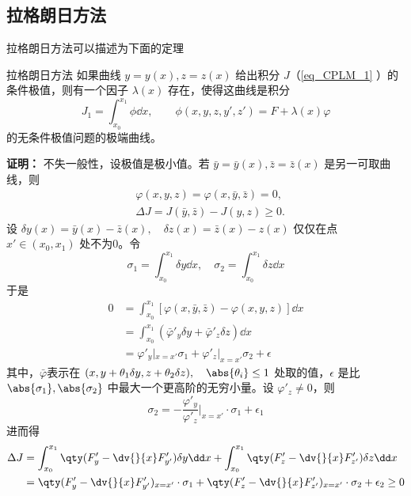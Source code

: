 \subsection{拉格朗日方法}
拉格朗日方法可以描述为下面的定理
\begin{theorem}{拉格朗日方法}
如果曲线 $y=y(x),z=z(x)$ 给出积分 $J$（\autoref{eq_CPLM_1} ）的条件极值，则有一个因子 $\lambda(x)$ 存在，使得这曲线是积分
\begin{equation}
J_1=\int_{x_0}^{x_1}\phi \dd x,\qquad \phi(x,y,z,y',z')=F+\lambda(x)\varphi
\end{equation}
的无条件极值问题的极端曲线。
\end{theorem}
\textbf{证明：}
不失一般性，设极值是极小值。若 $\bar y=\bar y(x),\bar z=\bar z(x)$ 是另一可取曲线，则
\begin{equation}
\begin{aligned}
&\varphi(x,y,z)=\varphi(x,\bar y,\bar z)=0,\\
&\Delta J=J(\bar y,\bar z)-J(y,z)\geq0.
\end{aligned}
\end{equation}
设 $\delta y(x)=\bar y(x)-\bar z(x),\quad\delta z(x)=\bar z(x)-z(x)$ 仅仅在点 $x'\in (x_0,x_1)$ 处不为0。令
\begin{equation}
\sigma_1=\int_{x_0}^{x_1}\delta y\dd x,\quad \sigma_2=\int_{x_0}^{x_1}\delta z\dd x
\end{equation}
于是
\begin{equation}
\begin{aligned}
0&=\int_{x_0}^{x_1}[\varphi(x,\bar y,\bar z)-\varphi(x,y,z)]\dd x\\
&=\int_{x_0}^{x_1}(\bar\varphi'_y\delta y+\bar\varphi'_z\delta z)\dd x\\
&=\varphi'_y|_{x=x'}\sigma_1+\varphi'_z|_{x=x'}\sigma_2+\epsilon
\end{aligned}
\end{equation}
其中，$\bar\varphi$表示在 $(x,y+\theta_1\delta y,z+\theta_2\delta z),\quad \abs{\theta_i}\leq 1$ 处取的值，$\epsilon$ 是比 $\abs{\sigma_1},\abs{\sigma_2}$ 中最大一个更高阶的无穷小量。设 $\varphi'_z\neq0$，则
\begin{equation}\label{eq_CPLM_2}
\sigma_2=-\frac{\varphi'_y}{\varphi'_z}\Big|_{x=x'}\cdot\sigma_1+\epsilon_1
\end{equation}
进而得
\begin{equation}\label{eq_CPLM_3}
\begin{aligned}
\Delta J&=\int_{x_0}^{x_1}\qty(F'_y-\dv{}{x}F'_{y'})\delta y\dd x+\int_{x_0}^{x_1}\qty(F'_z-\dv{}{x}F'_{z'})\delta z\dd x\\
&=\qty(F'_y-\dv{}{x}F'_{y'})_{x=x'}\cdot\sigma_1+\qty(F'_z-\dv{}{x}F'_{z'})_{x=x'}\cdot\sigma_2+\epsilon_2\geq0
\end{aligned}
\end{equation}
